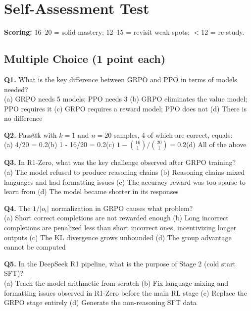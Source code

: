 \documentclass[11pt, a4paper]{article}
\begin{document}
\newpage
\section{Self-Assessment Test}

\textbf{Scoring:} 16--20 = solid mastery; 12--15 = revisit weak spots; $<$12 = re-study.

\subsection*{Multiple Choice (1 point each)}

\textbf{Q1.} What is the key difference between GRPO and PPO in terms of models needed?\\
(a) GRPO needs 5 models; PPO needs 3\quad
(b) GRPO eliminates the value model; PPO requires it\quad
(c) GRPO requires a reward model; PPO does not\quad
(d) There is no difference

\textbf{Q2.} Pass@k with $k=1$ and $n=20$ samples, 4 of which are correct, equals:\\
(a) 4/20 = 0.2\quad (b) 1 - 16/20 = 0.2\quad (c) $1 - \binom{16}{1}/\binom{20}{1} = 0.2$\quad (d) All of the above

\textbf{Q3.} In R1-Zero, what was the key challenge observed after GRPO training?\\
(a) The model refused to produce reasoning chains\quad
(b) Reasoning chains mixed languages and had formatting issues\quad
(c) The accuracy reward was too sparse to learn from\quad
(d) The model became shorter in its responses

\textbf{Q4.} The $1/|o_i|$ normalization in GRPO causes what problem?\\
(a) Short correct completions are not rewarded enough\quad
(b) Long incorrect completions are penalized less than short incorrect ones, incentivizing longer outputs\quad
(c) The KL divergence grows unbounded\quad
(d) The group advantage cannot be computed

\textbf{Q5.} In the DeepSeek R1 pipeline, what is the purpose of Stage 2 (cold start SFT)?\\
(a) Teach the model arithmetic from scratch\quad
(b) Fix language mixing and formatting issues observed in R1-Zero before the main RL stage\quad
(c) Replace the GRPO stage entirely\quad
(d) Generate the non-reasoning SFT data
\end{document}
